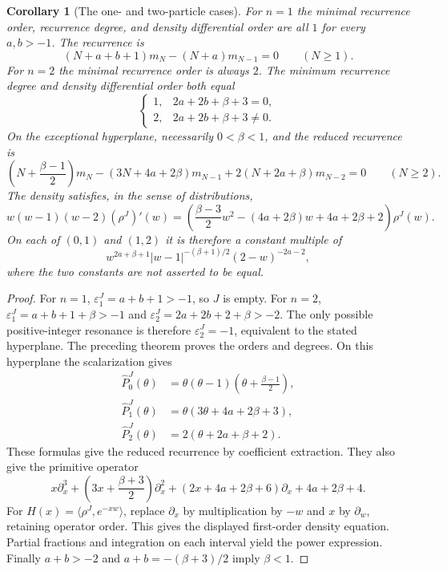 \documentclass[11pt,a4paper]{article}
\newtheorem{corollary}[theorem]{Corollary}
\theoremstyle{definition}
\theoremstyle{remark}
\numberwithin{equation}{section}
\begin{document}
\begin{corollary}[The one- and two-particle cases]
\label{V:cor:jacobi-small-rank}
For $n=1$ the minimal recurrence order, recurrence degree, and density
differential order are all $1$ for every $a,b>-1$. The recurrence is
\[
 (N+a+b+1)m_N-(N+a)m_{N-1}=0\qquad(N\ge1).
\]
For $n=2$ the minimal recurrence order is always $2$. The minimum
recurrence degree and density differential order both equal
\[
 \begin{cases}
 1,&2a+2b+\beta+3=0,\\
 2,&2a+2b+\beta+3\ne0.
 \end{cases}
\]
On the exceptional hyperplane, necessarily $0<\beta<1$, and the reduced
recurrence is
\[
 \left(N+\frac{\beta-1}{2}\right)m_N
 -(3N+4a+2\beta)m_{N-1}
 +2(N+2a+\beta)m_{N-2}=0\qquad(N\ge2).
\]
The density satisfies, in the sense of distributions,
\[
 w(w-1)(w-2)(\rho^J)'(w)=
 \left(\frac{\beta-3}{2}w^2-(4a+2\beta)w+4a+2\beta+2\right)\rho^J(w).
\]
On each of $(0,1)$ and $(1,2)$ it is therefore a constant multiple of
\[
 w^{2a+\beta+1}|w-1|^{-(\beta+1)/2}(2-w)^{-2a-2},
\]
where the two constants are not asserted to be equal.
\end{corollary}
\begin{proof}
For $n=1$, $\varepsilon^J_1=a+b+1>-1$, so $J$ is empty.
For $n=2$, $\varepsilon^J_1=a+b+1+\beta>-1$ and
$\varepsilon^J_2=2a+2b+2+\beta>-2$.
The only possible positive-integer resonance is therefore
$\varepsilon^J_2=-1$, equivalent to the stated hyperplane. The preceding
theorem proves the orders and degrees.
On this hyperplane the scalarization gives
\[
 \begin{split}
 \hat P^J_0(\theta)&=\theta(\theta-1)
             \left(\theta+\frac{\beta-1}{2}\right),\\
 \hat P^J_1(\theta)&=\theta(3\theta+4a+2\beta+3),\\
 \hat P^J_2(\theta)&=2(\theta+2a+\beta+2).
 \end{split}
\]
These formulas give the reduced recurrence by coefficient extraction.
They also give the primitive operator
\[
 x\partial_x^3+
 \left(3x+\frac{\beta+3}{2}\right)\partial_x^2+
 (2x+4a+2\beta+6)\partial_x+4a+2\beta+4.
\]
For $H(x)=\langle\rho^J,e^{-xw}\rangle$, replace
$\partial_x$ by multiplication by $-w$ and $x$ by $\partial_w$,
retaining operator order. This gives the displayed first-order density
equation. Partial fractions and integration on each interval yield the
power expression. Finally $a+b>-2$ and
$a+b=-(\beta+3)/2$ imply $\beta<1$.
\end{proof}
\end{document}
